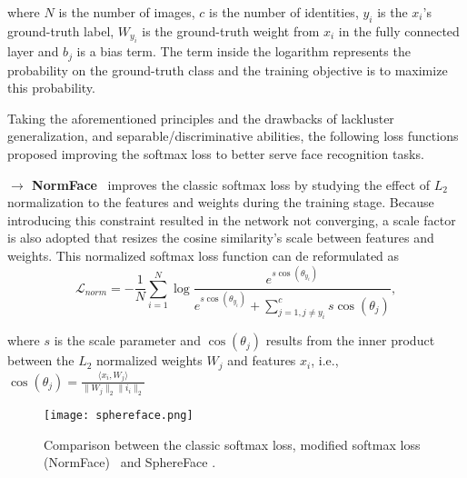 \documentclass[class=report, crop=false, a4paper, 12pt]{standalone}
\begin{document}
\noindent where $N$ is the number of images, $c$ is the number of identities, $y_i$ is the $x_i$'s ground-truth label, $W_{y_i}$ is the ground-truth weight from $x_i$ in the fully connected layer and $b_j$ is a bias term. The term inside the logarithm represents the probability on the ground-truth class and the training objective is to maximize this probability.

\vspace{\baselineskip}
\par Taking the aforementioned principles and the drawbacks of lackluster generalization, and separable/discriminative abilities, the following loss functions proposed improving the softmax loss to better serve face recognition tasks.

\vspace{0.7\baselineskip}
\noindent\textbf{$\rightarrow$ NormFace}~\autocite{wangNormFaceL2Hypersphere2017} improves the classic softmax loss by studying the effect of $L_2$ normalization to the features and weights during the training stage. Because introducing this constraint resulted in the network not converging, a scale factor is also adopted that resizes the cosine similarity's scale between features and weights. This normalized softmax loss function can de reformulated as
\begin{equation}
\mathcal{L}_{norm} = -\frac{1}{N}\sum_{i=1}^{N}\log{\frac{e^{s \cos{(\theta_{y_i})}}}{e^{s \cos{(\theta_{y_i})}}+\sum_{j=1, j\neq y_i}^{c}s \cos{(\theta_{j})}}},
\end{equation}

\noindent where $s$ is the scale parameter and $\cos{(\theta_j)}$ results from the inner product between the $L_2$ normalized  weights $W_j$ and features $x_i$, i.e., $\cos{(\theta_j)}=\frac{\langle x_i, W_j\rangle}{\|W_j\|_2\|i_i\|_2}$

\begin{figure}[!h]
    \centering
    \texttt{[image: sphereface.png]}
    \caption[Comparison between the classic softmax loss, modified softmax loss (NormFace) and SphereFace]{Comparison between the classic softmax loss, modified softmax loss (NormFace)~\autocite{wangNormFaceL2Hypersphere2017} and SphereFace \autocite{liuSphereFaceDeepHypersphere2018}.}
    \label{fig:sphereface}
\end{figure}
\end{document}
